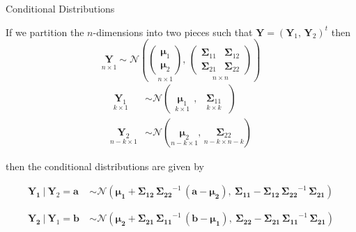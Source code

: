 \documentclass[11pt,ignorenonframetext,]{beamer}
\begin{document}
\begin{frame}[t]{Conditional Distributions}
\protect\hypertarget{conditional-distributions}{}

If we partition the \(n\)-dimensions into two pieces such that
\(\symbf{Y} = (\symbf{Y}_1,\, \symbf{Y}_2)^t\) then \footnotesize \[
\underset{n \times 1}{\symbf{Y}} \sim \mathcal{N}\left(
  \underset{n \times 1}{\begin{pmatrix}\symbf{\mu}_1 \\ \symbf{\mu}_2\end{pmatrix}},\, 
  \underset{n \times n}{\begin{pmatrix} 
    \symbf{\Sigma}_{11} & \symbf{\Sigma}_{12} \\ 
    \symbf{\Sigma}_{21} & \symbf{\Sigma}_{22} 
  \end{pmatrix}}
\right)
\] \[ 
\begin{aligned}
\underset{k \times 1}{~~\symbf{Y}_1~~} &\sim \mathcal{N}(\underset{k \times 1}{~~~\symbf{\mu}_1~~~},\, \underset{k \times k}{~~~\symbf{\Sigma}_{11}~~~}) \\ 
\underset{n-k \times 1}{\symbf{Y}_2} &\sim \mathcal{N}(\underset{n-k \times 1}{\symbf{\mu}_2},\, \underset{n-k \times n-k}{\symbf{\Sigma}_{22}})
\end{aligned} 
\]

\pause

\normalsize \vspace{2mm}

then the conditional distributions are given by

\footnotesize

\[\begin{aligned}
\symbf{Y_1} ~|~ \symbf{Y}_2 = \symbf{a} ~&\sim \mathcal{N}(\symbf{\mu_1} + \symbf{\Sigma_{12}} \, \symbf{\Sigma_{22}}^{-1} \, (\symbf{a} - \symbf{\mu_2}),~ \symbf{\Sigma_{11}}-\symbf{\Sigma_{12}}\,\symbf{\Sigma_{22}}^{-1} \, \symbf{\Sigma_{21}}) \\
\\
\\
\symbf{Y_2} ~|~ \symbf{Y}_1 = \symbf{b} ~&\sim \mathcal{N}(\symbf{\mu_2} + \symbf{\Sigma_{21}} \, \symbf{\Sigma_{11}}^{-1} \, (\symbf{b} - \symbf{\mu_1}),~ \symbf{\Sigma_{22}}-\symbf{\Sigma_{21}}\,\symbf{\Sigma_{11}}^{-1} \, \symbf{\Sigma_{21}})
\end{aligned}\]

\end{frame}
\end{document}
